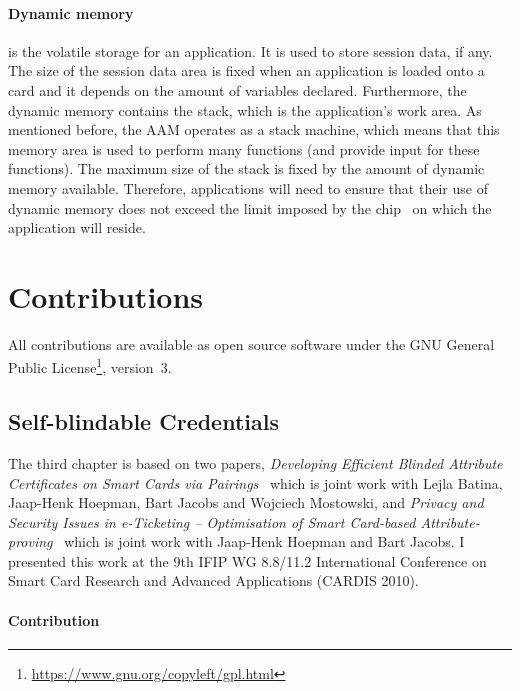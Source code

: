 \paragraph{Dynamic memory} is the volatile storage for an application. It is
used to store session data, if any. The size of the session data area is fixed
when an application is loaded onto a card and it depends on the amount of
variables declared. Furthermore, the dynamic memory contains the stack, which
is the application's work area. As mentioned before, the AAM operates as a
stack machine, which means that this memory area is used to perform many
functions (and provide input for these functions). The maximum size of the
stack is fixed by the amount of dynamic memory available. Therefore,
applications will need to ensure that their use of dynamic memory does not
exceed the limit imposed by the chip~\cite{MIR2012} on which the application
will reside.

\section{Contributions}

All contributions are available as open source software under the GNU General
Public License\footnote{\url{https://www.gnu.org/copyleft/gpl.html}}, version~3.

\subsection{Self-blindable Credentials}

The third chapter is based on two papers, \emph{Developing Efficient Blinded
Attribute Certificates on Smart Cards via Pairings}~\cite{BatinaHJMV10} which
is joint work with Lejla Batina, Jaap-Henk Hoepman, Bart Jacobs and Wojciech
Mostowski, and \emph{Privacy and Security Issues in e-Ticketing -- Optimisation
of Smart Card-based Attribute-proving}~\cite{HoepmanJV10} which is joint work
with Jaap-Henk Hoepman and Bart Jacobs. I presented this work at the 9th IFIP WG
8.8/11.2 International Conference on Smart Card Research and Advanced
Applications (CARDIS 2010).

\paragraph{Contribution}

